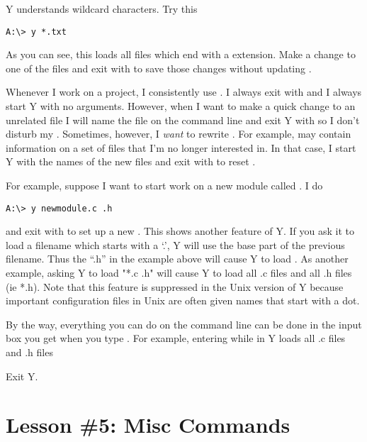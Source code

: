 Y understands wildcard characters. Try this

\begin{verbatim}
A:\> y *.txt
\end{verbatim}

As you can see, this loads all files which end with a  extension. Make a change
to one of the files and exit with  to save those changes without updating
.

Whenever I work on a project, I consistently use . I always exit with
 and I always start Y with no arguments. However, when I want to make a quick
change to an unrelated file I will name the file on the command line and exit Y with
 so I don't disturb my . Sometimes, however, I \emph{want}
to rewrite . For example,  may contain information
on a set of files that I'm no longer interested in. In that case, I start Y with the names of
the new files and exit with  to reset .

For example, suppose I want to start work on a new module called . I do

\begin{verbatim}
A:\> y newmodule.c .h
\end{verbatim}

and exit with  to set up a new . This shows another feature
of Y. If you ask it to load a filename which starts with a `.', Y will use the base part of the
previous filename. Thus the ``.h'' in the example above will cause Y to load
. As another example, asking Y to load "*.c .h" will cause Y to load all
.c files and all .h files (ie *.h). Note that this feature is suppressed in the Unix version of
Y because important configuration files in Unix are often given names that start with a dot.

By the way, everything you can do on the command line can be done in the input box you get when
you type . For example, entering  while in Y loads all .c files and
.h files

Exit Y.

\section{Lesson \#5: Misc Commands}

